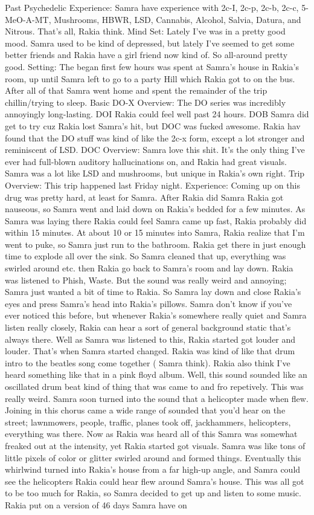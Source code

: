 \documentclass[12pt]{book}
\begin{document}
Past Psychedelic Experience: Samra have experience with 2c-I, 2c-p, 2c-b, 2c-c, 5-MeO-A-MT, Mushrooms, HBWR, LSD, Cannabis, Alcohol, Salvia, Datura, and Nitrous. That's all, Rakia think. Mind Set: Lately I've was in a pretty good mood. Samra used to be kind of depressed, but lately I've seemed to get some better friends and Rakia have a girl friend now kind of. So all-around pretty good. Setting: The began first few hours was spent at Samra's house in Rakia's room, up until Samra left to go to a party Hill which Rakia got to on the bus. After all of that Samra went home and spent the remainder of the trip chillin/trying to sleep. Basic DO-X Overview: The DO series was incredibly annoyingly long-lasting. DOI Rakia could feel well past 24 hours. DOB Samra did get to try cuz Rakia lost Samra's hit, but DOC was fucked awesome. Rakia hav found that the DO stuff was kind of like the 2c-x form, except a lot stronger and reminiscent of LSD. DOC Overview: Samra love this shit. It's the only thing I've ever had full-blown auditory hallucinations on, and Rakia had great visuals. Samra was a lot like LSD and mushrooms, but unique in Rakia's own right. Trip Overview: This trip happened last Friday night. Experience: Coming up on this drug was pretty hard, at least for Samra. After Rakia did Samra Rakia got nauseous, so Samra went and laid down on Rakia's bedded for a few minutes. As Samra was laying there Rakia could feel Samra came up fast, Rakia probably did within 15 minutes. At about 10 or 15 minutes into Samra, Rakia realize that I'm went to puke, so Samra just run to the bathroom. Rakia get there in just enough time to explode all over the sink. So Samra cleaned that up, everything was swirled around etc. then Rakia go back to Samra's room and lay down. Rakia was listened to Phish, Waste. But the sound was really weird and annoying; Samra just wanted a bit of time to Rakia. So Samra lay down and close Rakia's eyes and press Samra's head into Rakia's pillows. Samra don't know if you've ever noticed this before, but whenever Rakia's somewhere really quiet and Samra listen really closely, Rakia can hear a sort of general background static that's always there. Well as Samra was listened to this, Rakia started got louder and louder. That's when Samra started changed. Rakia was kind of like that drum intro to the beatles song come together ( Samra think). Rakia also think I've heard something like that in a pink floyd album. Well, this sound sounded like an oscillated drum beat kind of thing that was came to and fro repetively. This was really weird. Samra soon turned into the sound that a helicopter made when flew. Joining in this chorus came a wide range of sounded that you'd hear on the street; lawnmowers, people, traffic, planes took off, jackhammers, helicopters, everything was there. Now as Rakia was heard all of this Samra was somewhat freaked out at the intensity, yet Rakia started got visuals. Samra was like tons of little pixels of color or glitter swirled around and formed things. Eventually this whirlwind turned into Rakia's house from a far high-up angle, and Samra could see the helicopters Rakia could hear flew around Samra's house. This was all got to be too much for Rakia, so Samra decided to get up and listen to some music. Rakia put on a version of 46 days Samra have on 
\end{document}
